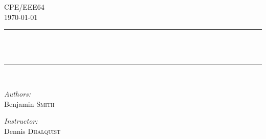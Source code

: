 \begin{titlepage}
	\begin{center}
		\vspace{20 cm}
		\textsc{\LARGE CPE/EEE64}\\[1.3cm]
		\textsc{\Large \today}\\[0.5cm]
		\vspace{5 mm}
		
		\rule{415pt}{2pt}\\
		{ \huge \bfseries \TITLE \\[0.2cm] }
		\rule{415pt}{2pt}\\
		\vspace{10mm}
		\begin{minipage}{0.4\textwidth}
			\begin{flushleft} \large
			\emph{Authors:}\\
				Benjamin		\textsc{Smith}\\
			\end{flushleft}
		\end{minipage}
		\begin{minipage}{0.4\textwidth}
			\begin{flushright} \large
				\emph{Instructor:} \\
				Dennis 	\textsc{Dhalquist}\\
			\end{flushright}
		\end{minipage}
	\end{center}
	
	\vspace{30mm}
	
	\begin{center}
		\begin{minipage}{.9\textwidth}
			\begin{flushleft} \large
				\begin{abstract}
					\ABSTRACT \\
				\end{abstract}
			\end{flushleft}
		\end{minipage}
	\end{center}
	\vfill

\end{titlepage}